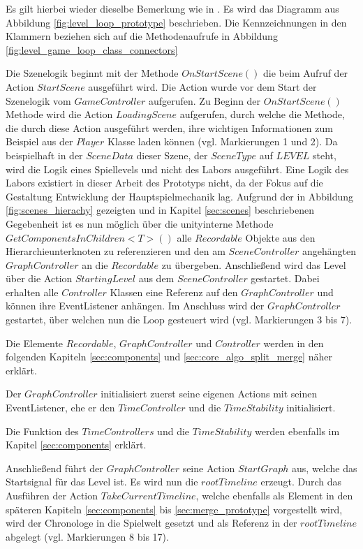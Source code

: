 Es gilt hierbei wieder dieselbe Bemerkung wie in . Es wird das Diagramm aus Abbildung \ref{fig:level_loop_prototype}  beschrieben. Die Kennzeichnungen in den Klammern beziehen sich auf die Methodenaufrufe in Abbildung \ref{fig:level_game_loop_class_connectors} 

Die Szenelogik beginnt mit der Methode $OnStartScene()$ die beim Aufruf der Action $StartScene$ ausgeführt wird. Die Action wurde vor dem Start der Szenelogik vom $GameController$ aufgerufen. Zu Beginn der $OnStartScene()$ Methode wird die Action $LoadingScene$ aufgerufen, durch welche die Methode, die durch diese Action ausgeführt werden, ihre wichtigen Informationen zum Beispiel aus der $Player$ Klasse laden können (vgl. Markierungen 1 und 2). Da beispielhaft in der $SceneData$ dieser Szene, der $SceneType$ auf $LEVEL$ steht, wird die Logik eines Spiellevels und nicht des Labors ausgeführt. Eine Logik des Labors existiert in dieser Arbeit des Prototyps nicht, da der Fokus auf die Gestaltung Entwicklung der Hauptspielmechanik lag. Aufgrund der in Abbildung \ref{fig:scenes_hierachy} gezeigten und in Kapitel \ref{sec:scenes} beschriebenen Gegebenheit ist es nun möglich über die unityinterne Methode $GetComponentsInChildren<T>()$ alle $Recordable$ Objekte aus den Hierarchieunterknoten zu referenzieren und den am $SceneController$ angehängten $GraphController$ an die $Recordable$ zu übergeben. Anschließend wird das Level über die Action $StartingLevel$ aus dem $SceneController$ gestartet. Dabei erhalten alle $Controller$ Klassen eine Referenz auf den $GraphController$ und können ihre EventListener anhängen. Im Anschluss wird der $GraphController$ gestartet, über welchen nun die Loop gesteuert wird (vgl. Markierungen 3 bis 7).

Die Elemente $Recordable$, $GraphController$ und $Controller$ werden in den folgenden Kapiteln \ref{sec:components} und \ref{sec:core_algo_split_merge} näher erklärt.

Der $GraphController$ initialisiert zuerst seine eigenen Actions mit seinen EventListener, ehe er den $TimeController$ und die $TimeStability$ initialisiert. 

Die Funktion des $TimeControllers$ und die $TimeStability$ werden ebenfalls im Kapitel \ref{sec:components} erklärt.

Anschließend führt der $GraphController$ seine Action $StartGraph$ aus, welche das Startsignal für das Level ist. Es wird nun die $rootTimeline$ erzeugt. Durch das Ausführen der Action $TakeCurrentTimeline$, welche ebenfalls als Element in den späteren Kapiteln \ref{sec:components} bis \ref{sec:merge_prototype} vorgestellt wird, wird der Chronologe in die Spielwelt gesetzt und als Referenz in der $rootTimeline$ abgelegt (vgl. Markierungen 8 bis 17).

